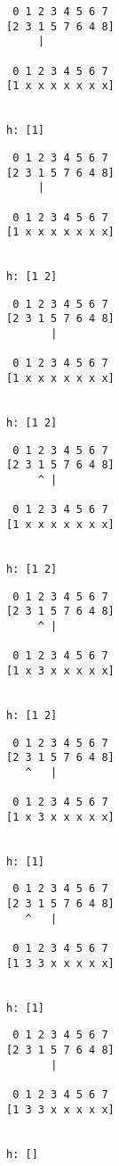 { \begin{verbatim}
 0 1 2 3 4 5 6 7
[2 3 1 5 7 6 4 8]
     |

 0 1 2 3 4 5 6 7
[1 x x x x x x x]


h: [1]
\end{verbatim} }

{ \begin{verbatim}
 0 1 2 3 4 5 6 7
[2 3 1 5 7 6 4 8]
     |

 0 1 2 3 4 5 6 7
[1 x x x x x x x]


h: [1 2]
\end{verbatim} }

{ \begin{verbatim}
 0 1 2 3 4 5 6 7
[2 3 1 5 7 6 4 8]
       |

 0 1 2 3 4 5 6 7
[1 x x x x x x x]


h: [1 2]
\end{verbatim} }

{ \begin{verbatim}
 0 1 2 3 4 5 6 7
[2 3 1 5 7 6 4 8]
     ^ |

 0 1 2 3 4 5 6 7
[1 x x x x x x x]


h: [1 2]
\end{verbatim} }

{ \begin{verbatim}
 0 1 2 3 4 5 6 7
[2 3 1 5 7 6 4 8]
     ^ |

 0 1 2 3 4 5 6 7
[1 x 3 x x x x x]


h: [1 2]
\end{verbatim} }

{ \begin{verbatim}
 0 1 2 3 4 5 6 7
[2 3 1 5 7 6 4 8]
   ^   |

 0 1 2 3 4 5 6 7
[1 x 3 x x x x x]


h: [1]
\end{verbatim} }

{ \begin{verbatim}
 0 1 2 3 4 5 6 7
[2 3 1 5 7 6 4 8]
   ^   |

 0 1 2 3 4 5 6 7
[1 3 3 x x x x x]


h: [1]
\end{verbatim} }

{ \begin{verbatim}
 0 1 2 3 4 5 6 7
[2 3 1 5 7 6 4 8]
       |

 0 1 2 3 4 5 6 7
[1 3 3 x x x x x]


h: []
\end{verbatim} }

